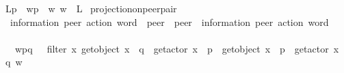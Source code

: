 \begin{isabellebody}
\ \ {\isachardoublequoteopen}{\isacharparenleft}{\kern0pt}L{\isasymdownharpoonright}\isactrlsub p{\isacharparenright}{\kern0pt}\ {\isasymequiv}\ {\isacharbraceleft}{\kern0pt}{\isacharparenleft}{\kern0pt}w{\isasymdown}\isactrlsub p{\isacharparenright}{\kern0pt}\ {\isacharbar}{\kern0pt}\ w{\isachardot}{\kern0pt}\ w\ {\isasymin}\ L{\isacharbraceright}{\kern0pt}{\isachardoublequoteclose}\isanewline
\isanewline
{}\isamarkupfalse%
\ projection{\isacharunderscore}{\kern0pt}on{\isacharunderscore}{\kern0pt}peer{\isacharunderscore}{\kern0pt}pair\isanewline
\ \ {\isacharcolon}{\kern0pt}{\isacharcolon}{\kern0pt}\ {\isachardoublequoteopen}{\isacharparenleft}{\kern0pt}{\isacharprime}{\kern0pt}information{\isacharcomma}{\kern0pt}\ {\isacharprime}{\kern0pt}peer{\isacharparenright}{\kern0pt}\ action\ word\ {\isasymRightarrow}\ {\isacharprime}{\kern0pt}peer\ {\isasymRightarrow}\ {\isacharprime}{\kern0pt}peer\ {\isasymRightarrow}\ {\isacharparenleft}{\kern0pt}{\isacharprime}{\kern0pt}information{\isacharcomma}{\kern0pt}\ {\isacharprime}{\kern0pt}peer{\isacharparenright}{\kern0pt}\ action\ word{\isachardoublequoteclose}\ \ {\isacharparenleft}{\kern0pt}{\isachardoublequoteopen}{\isacharunderscore}{\kern0pt}{\isasymdown}\isactrlsub {\isacharbraceleft}{\kern0pt}\isactrlsub {\isacharunderscore}{\kern0pt}\isactrlsub {\isacharcomma}{\kern0pt}\isactrlsub {\isacharunderscore}{\kern0pt}\isactrlsub {\isacharbraceright}{\kern0pt}{\isachardoublequoteclose}\ {\isacharbrackleft}{\kern0pt}{}{}{\isacharcomma}{\kern0pt}\ {}{}{\isacharcomma}{\kern0pt}\ {}{}{\isacharbrackright}{\kern0pt}\ {}{}{}{\isacharparenright}{\kern0pt}\isanewline
\ \ \isanewline
\ \ \ \ {\isachardoublequoteopen}w{\isasymdown}\isactrlsub {\isacharbraceleft}{\kern0pt}\isactrlsub p\isactrlsub {\isacharcomma}{\kern0pt}\isactrlsub q\isactrlsub {\isacharbraceright}{\kern0pt}\ \ {\isasymequiv}\ filter\ {\isacharparenleft}{\kern0pt}{\isasymlambda}x{\isachardot}{\kern0pt}\ {\isacharparenleft}{\kern0pt}get{\isacharunderscore}{\kern0pt}object\ x\ {\isacharequal}{\kern0pt}\ q\ {\isasymand}\ get{\isacharunderscore}{\kern0pt}actor\ x\ {\isacharequal}{\kern0pt}\ p{\isacharparenright}{\kern0pt}\ {\isasymor}\ {\isacharparenleft}{\kern0pt}get{\isacharunderscore}{\kern0pt}object\ x\ {\isacharequal}{\kern0pt}\ p\ {\isasymand}\ get{\isacharunderscore}{\kern0pt}actor\ x\ {\isacharequal}{\kern0pt}\ q{\isacharparenright}{\kern0pt}{\isacharparenright}{\kern0pt}\ w{\isachardoublequoteclose}\isanewline

\end{isabellebody}
